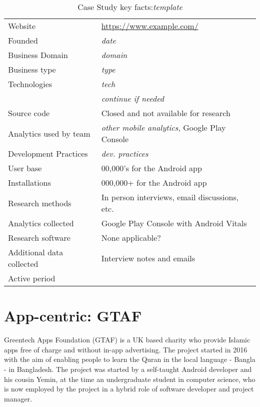 {\renewcommand{\arraystretch}{0.8}%
\begin{table}[htbp!]
    \centering
    \small
    \setlength{\tabcolsep}{1pt}
    \begin{tabular}{ll}
       \toprule
       Website &\url{https://www.example.com/} \\
       Founded &\emph{date}\\
       Business Domain &\emph{domain}\\
       Business type &\emph{type}\\
       Technologies  &\emph{tech}\\
       &\emph{continue if needed} \\
       Source code  &Closed and not available for research \\
       Analytics used by team &\emph{other mobile analytics}, Google Play Console \\
       Development Practices &\emph{dev. practices}\\
       \midrule
       User base & 00,000's for the Android app \\
       Installations & 000,000+ for the Android app \\
       \midrule
       Research methods &In person interviews, email discussions, etc. \\
       Analytics collected &Google Play Console with Android Vitals \\
       Research software & None applicable? \\
       Additional data collected &Interview notes and emails \\
       Active period & \\
       \bottomrule
    \end{tabular}
    \caption{Case Study key facts:\emph{template}}
    \label{tab:blank_case_study_anaytics_overview}
\end{table}
}


\clearpage
\section{App-centric: GTAF}
Greentech Apps Foundation (GTAF) is a UK based charity who provide Islamic apps free of charge and without in-app advertising. The project started in 2016 with the aim of enabling people to learn the Quran in the local language - Bangla - in Bangladesh. The project was started by a self-taught Android developer and his cousin Yemin, at the time an undergraduate student in computer science, who is now employed by the project in a hybrid role of software developer and project manager. 

